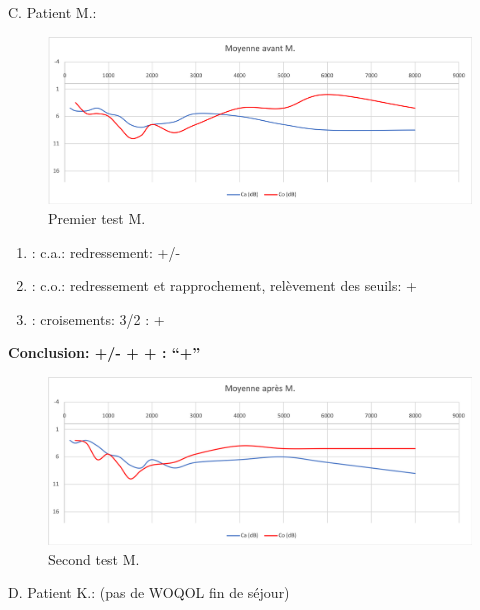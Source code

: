                 C. Patient M.:

                \begin{figure}
\centering
\includegraphics[width=0.7\linewidth]{images/graphiques/m_pre.png}
\caption[Moyenne OG+OD]{Premier test M.}
       
\label{groupecontroleimage1}
\end{figure}

	\begin{enumerate}
 		
 		\item : c.a.: redressement: +/-
                
 		\item : c.o.: redressement et rapprochement, relèvement des seuils: +
 		\item : croisements: 3/2 :  +
                  
                \end{enumerate}

                \textbf{  Conclusion:  +/-  +  +       : ``+''}

                        \begin{figure}
\centering
\includegraphics[width=0.7\linewidth]{images/graphiques/m_post.png}
\caption[Moyenne OG+OD]{Second test M.}
       
\label{groupecontroleimage1}
\end{figure}


                
D. Patient K.:  (pas de WOQOL fin de séjour)

